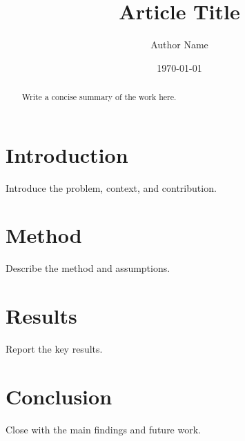 \documentclass[11pt]{article}
\title{Article Title}
\author{Author Name}
\date{\today}
\begin{document}
\maketitle

\begin{abstract}
Write a concise summary of the work here.
\end{abstract}

\section{Introduction}
Introduce the problem, context, and contribution.

\section{Method}
Describe the method and assumptions.

\section{Results}
Report the key results.

\section{Conclusion}
Close with the main findings and future work.



\end{document}

